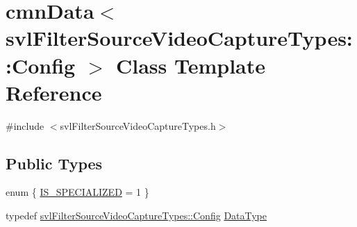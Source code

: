 \hypertarget{classcmn_data_3_01svl_filter_source_video_capture_types_1_1_config_01_4}{}\section{cmn\+Data$<$ svl\+Filter\+Source\+Video\+Capture\+Types\+:\+:Config $>$ Class Template Reference}
\label{classcmn_data_3_01svl_filter_source_video_capture_types_1_1_config_01_4}


{\ttfamily \#include $<$svl\+Filter\+Source\+Video\+Capture\+Types.\+h$>$}

\subsection*{Public Types}
\begin{DoxyCompactItemize}
\item 
enum \{ \hyperlink{classcmn_data_3_01svl_filter_source_video_capture_types_1_1_config_01_4_a2a9a92c1b483270a07fb4453ed08344fabcffae4188f1c2ab2261eeaa659ca91f}{I\+S\+\_\+\+S\+P\+E\+C\+I\+A\+L\+I\+Z\+E\+D} = 1
 \}
\item 
typedef \hyperlink{classsvl_filter_source_video_capture_types_1_1_config}{svl\+Filter\+Source\+Video\+Capture\+Types\+::\+Config} \hyperlink{classcmn_data_3_01svl_filter_source_video_capture_types_1_1_config_01_4_aff938e4d56457fbe9133d8b6cbcd5490}{Data\+Type}
\end{DoxyCompactItemize}
